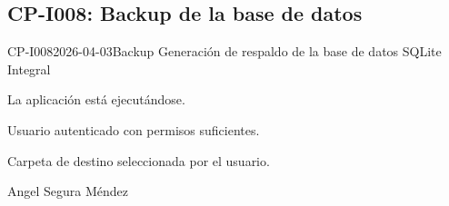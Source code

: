 \subsection{CP-I008: Backup de la base de datos}
\def\cpPasos{%
  \item Localizar la opción de Backup en el menú.
  \item Ejecutar el backup.
  \item Seleccionar carpeta de destino.
  \item Verificar que el archivo se generó.}
\def\cpResultadoE{%
  \item El sistema genera el archivo de respaldo SQLite en la carpeta seleccionada.}
\def\cpResultadoO{El sistema solicitó la carpeta de destino y generó el respaldo de
  la base de datos SQLite correctamente.}
\casoprueba
  {CP-I008}{2026-04-03}{Backup}
  {Generación de respaldo de la base de datos SQLite}
  {Integral}{\estadoAprobado}
  {\item La aplicación está ejecutándose.
   \item Usuario autenticado con permisos suficientes.}
  {\item Carpeta de destino seleccionada por el usuario.}
  {Angel Segura Méndez}
